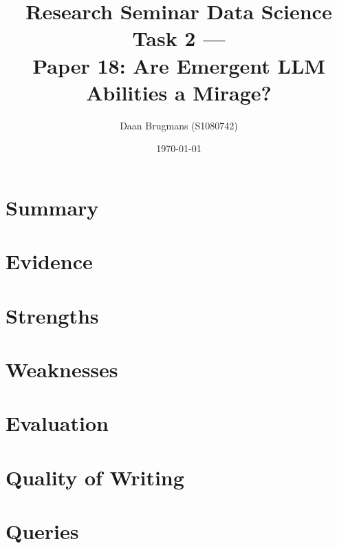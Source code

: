 \documentclass{IEEEtran}
\begin{document}
\title{Research Seminar Data Science Task 2 ---\\Paper 18: Are Emergent LLM Abilities a Mirage?}
\author{Daan Brugmans (S1080742)}
\date{\today}

\maketitle

\section{Summary}

\section{Evidence}

\section{Strengths}

\section{Weaknesses}

\section{Evaluation}

\section{Quality of Writing}

\section{Queries}
\end{document}
